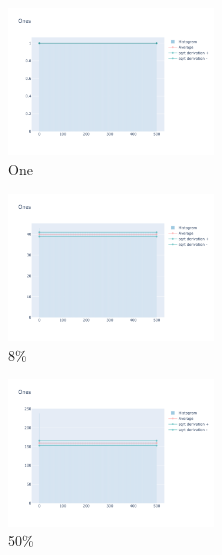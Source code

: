 \documentclass[12pt, fleqn]{report}                             %
\theoremstyle{break}                                            %
\begin{document}
      \begin{figure}[ht!]
        \centering
        \begin{subfigure}[b]{0.4\linewidth}
          \includegraphics[width=0.6\textwidth]{Images/108/dia-a.png}
          \caption{One}
        \end{subfigure}
        \begin{subfigure}[b]{0.4\linewidth}
          \includegraphics[width=0.6\textwidth]{Images/108/dia-b.png}
          \caption{8\%}
        \end{subfigure}
        \begin{subfigure}[b]{0.4\linewidth}
          \includegraphics[width=0.6\textwidth]{Images/108/dia-c.png}
          \caption{50\%}
        \end{subfigure}
        \begin{subfigure}[b]{0.4\linewidth}

\end{subfigure}
\end{figure}
\end{document}
